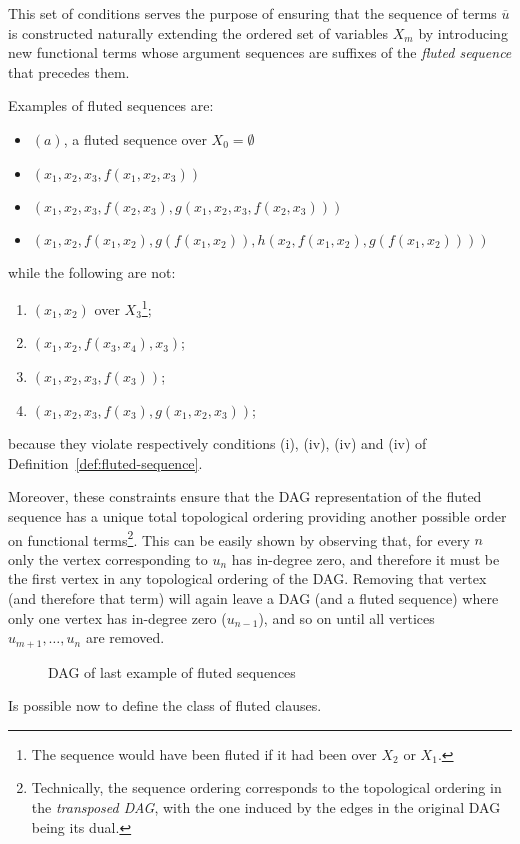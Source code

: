 This set of conditions serves the purpose of ensuring that the sequence of terms \(\overline{u}\) is constructed naturally extending the ordered set of variables \(X_m\) by introducing new functional terms whose argument sequences are suffixes of the \emph{fluted sequence} that precedes them.

Examples of fluted sequences are:
\begin{itemize}
  \item \((a)\), a fluted sequence over \(X_0=\emptyset\)
  \item \((x_1,x_2,x_3,f(x_1,x_2,x_3))\)
  \item \((x_1,x_2,x_3,f(x_2,x_3),g(x_1,x_2,x_3,f(x_2,x_3)))\)
  \item \((x_1,x_2,f(x_1,x_2),g(f(x_1,x_2)),h(x_2,f(x_1,x_2),g(f(x_1,x_2))))\)
\end{itemize}
while the following are not:
\begin{enumerate}[label= (\roman*)]
  \item \((x_1,x_2)\) over \(X_3\)\footnote{The sequence would have been fluted if it had been over \(X_2\) or \(X_1\).};
  \item \((x_1,x_2,f(x_3,x_4),x_3)\);
  \item \((x_1,x_2,x_3,f(x_3))\);
  \item \((x_1,x_2,x_3,f(x_3),g(x_1,x_2,x_3))\);
\end{enumerate}
because they violate respectively conditions (i), (iv), (iv) and (iv) of Definition~\ref{def:fluted-sequence}.

Moreover, these constraints ensure that the DAG representation of the fluted sequence has a unique total topological ordering providing another possible order on functional terms\footnote{Technically, the sequence ordering corresponds to the topological ordering in the \emph{transposed DAG}, with the one induced by the edges in the original DAG being its dual.}.
This can be easily shown by observing that, for every \(n\) only the vertex corresponding to \(u_n\) has in-degree zero, and therefore it must be the first vertex in any topological ordering of the DAG\@. Removing that vertex (and therefore that term) will again leave a DAG (and a fluted sequence) where only one vertex has in-degree zero (\(u_{n-1}\)), and so on until all vertices \(u_{m+1},\ldots, u_n\) are removed.

\begin{figure}[H]
\centering
{}
\caption{DAG of last example of fluted sequences}\label{fig:fluted-sequence-dag}
\end{figure}
Is possible now to define the class of fluted clauses.

